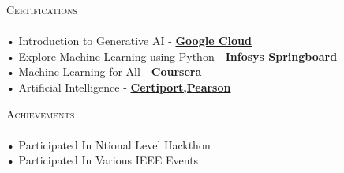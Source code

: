 \documentclass[a4paper]{article}
\newcommand{\lineunder} {
    \vspace*{-8pt} \\
    \hspace*{-18pt} \hrulefill \\
}
\newcommand{\header} [1] {
    {\hspace*{-18pt}\vspace*{6pt} \textsc{#1}}
    \vspace*{-6pt} \lineunder
}
\begin{document}
      \header{Certifications}
      \vspace{2mm}
      • Introduction to Generative AI - \textbf{\href{https://drive.google.com/file/d/1-QBRrn4wBdtTsZ36JYPnMillYUPRnk4Y/view}{Google Cloud}}\\
\vspace*{1mm}
      • Explore Machine Learning using Python - \textbf{\href{https://drive.google.com/file/d/1K0\_Yq8nf2tineJ3RUMciBk9FvN7ehiku/view}{Infosys Springboard}}\\
\vspace*{1mm}
      • Machine Learning for All - \textbf{\href{https://drive.google.com/file/d/1KEBBXfEaBQFvLKe0CUMnvwk2FSmSdrJk/view}{Coursera}}\\
\vspace*{1mm}
      • Artificial Intelligence - \textbf{\href{https://drive.google.com/file/d/1EpU7UyEBt2bx58jzWAg4dsaOttvLnWVb/view?usp=drive\_link}{Certiport,Pearson}}\\
\vspace*{1mm}
      \vspace{2mm}

\header{Achievements}
      \vspace{2mm}
      • Participated In Ntional Level Hackthon\\
\vspace*{1mm}
      • Participated In Various IEEE Events\\
\vspace*{1mm}

    \ 
    
\end{document}
